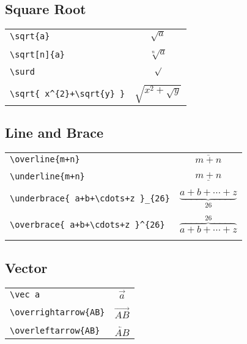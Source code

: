 \documentclass[a4paper]{report}
\begin{document}
\subsection{Square Root}
\begin{tabular}{l @{\quad} c}

\verb|\sqrt{a}| & $\sqrt{a}$\\\\

\verb|\sqrt[n]{a}| & $\sqrt[n]{a}$\\\\

\verb|\surd| & $\surd$\\\\

\verb|\sqrt{ x^{2}+\sqrt{y} }| & $\sqrt{ x^{2}+\sqrt{y} }$

\end{tabular}

\subsection{Line and Brace}

\begin{tabular}{l @{\quad} c}

\verb|\overline{m+n}| & $\overline{m+n}$\\\\

\verb|\underline{m+n}| & $\underline{m+n}$\\\\

\verb|\underbrace{ a+b+\cdots+z }_{26}| & $\underbrace{ a+b+\cdots+z
}_{26}$\\\\

\verb|\overbrace{ a+b+\cdots+z }^{26}| & $\overbrace{ a+b+\cdots+z }^{26}$\\\\

\end{tabular}

\subsection{Vector}

\begin{tabular}{l @{\quad} c}

\verb|\vec a| & $\vec a$\\\\

\verb|\overrightarrow{AB}| & $\overrightarrow{AB}$\\\\

\verb|\overleftarrow{AB}| & $\overleftarrow{AB}$

\end{tabular}
\end{document}
